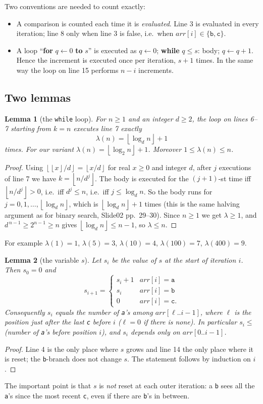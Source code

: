 \documentclass[11pt]{article}
\newtheorem{lemma}{Lemma}
\theoremstyle{remark}
\newcommand{\fl}[1]{\left\lfloor #1\right\rfloor}
\newcommand{\ta}{\texttt{a}}
\newcommand{\tb}{\texttt{b}}
\newcommand{\tc}{\texttt{c}}
\begin{document}
Two conventions are needed to count exactly:
\begin{itemize}[nosep]
\item A comparison is counted each time it is \emph{evaluated}. Line 3 is evaluated in every iteration; line 8 only when
line 3 is false, i.e.\ when $arr[i]\in\{\tb,\tc\}$.
\item A loop ``\textbf{for} $q\gets 0$ \textbf{to} $s$'' is executed as $q\gets 0$; \textbf{while} $q\le s$:
body; $q\gets q+1$. Hence the increment is executed once per iteration, $s+1$ times. In the same way the loop on
line 15 performs $n-i$ increments.
\end{itemize}

\subsection{Two lemmas}
\begin{lemma}[the \texttt{while} loop]\label{lem:log}
For $n\ge1$ and an integer $d\ge 2$, the loop on lines 6--7 starting from $k=n$ executes line 7 exactly
\[
\lambda(n) = \fl{\log_d n}+1
\]
times. For our variant $\lambda(n)=\fl{\log_2 n}+1$. Moreover $1\le \lambda(n)\le n$.
\end{lemma}
\begin{proof}
Using $\fl{\fl{x}/d}=\fl{x/d}$ for real $x\ge 0$ and integer $d$, after $j$ executions of line 7 we have
$k=\fl{n/d^{j}}$. The body is executed for the $(j+1)$-st time iff $\fl{n/d^{j}}>0$, i.e.\ iff $d^{j}\le n$, i.e.\ iff
$j\le \log_d n$. So the body runs for $j=0,1,\dots,\fl{\log_d n}$, which is $\fl{\log_d n}+1$ times (this is the same
halving argument as for binary search, Slide02 pp.~29--30). Since $n\ge1$ we get $\lambda\ge 1$, and
$d^{\,n-1}\ge 2^{n-1}\ge n$ gives $\fl{\log_d n}\le n-1$, so $\lambda\le n$.
\end{proof}
For example $\lambda(1)=1$, $\lambda(5)=3$, $\lambda(10)=4$, $\lambda(100)=7$, $\lambda(400)=9$.

\begin{lemma}[the variable $s$]\label{lem:s}
Let $s_i$ be the value of $s$ at the start of iteration $i$. Then $s_0=0$ and
\[
s_{i+1} = \begin{cases} s_i+1 & arr[i]=\ta\\ s_i & arr[i]=\tb\\ 0 & arr[i]=\tc.\end{cases}
\]
Consequently $s_i$ equals the number of \ta's among $arr[\ell..i-1]$, where $\ell$ is the position just after the last
\tc{} before $i$ ($\ell=0$ if there is none). In particular $s_i\le$ (number of \ta's before position $i$), and $s_i$
depends only on $arr[0..i-1]$.
\end{lemma}
\begin{proof}
Line 4 is the only place where $s$ grows and line 14 the only place where it is reset; the \tb-branch does not change
$s$. The statement follows by induction on $i$.
\end{proof}
The important point is that $s$ is \emph{not} reset at each outer iteration: a \tb{} sees all the \ta's since the most
recent \tc, even if there are \tb's in between.
\end{document}
